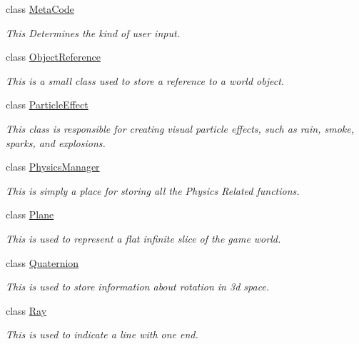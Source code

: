 \begin{DoxyCompactItemize}
class \hyperlink{classphys_1_1MetaCode}{MetaCode}
\begin{DoxyCompactList}\small\item\em This Determines the kind of user input. \item\end{DoxyCompactList}\item 
class \hyperlink{classphys_1_1ObjectReference}{ObjectReference}
\begin{DoxyCompactList}\small\item\em This is a small class used to store a reference to a world object. \item\end{DoxyCompactList}\item 
class \hyperlink{classphys_1_1ParticleEffect}{ParticleEffect}
\begin{DoxyCompactList}\small\item\em This class is responsible for creating visual particle effects, such as rain, smoke, sparks, and explosions. \item\end{DoxyCompactList}\item 
class \hyperlink{classphys_1_1PhysicsManager}{PhysicsManager}
\begin{DoxyCompactList}\small\item\em This is simply a place for storing all the Physics Related functions. \item\end{DoxyCompactList}\item 
class \hyperlink{classphys_1_1Plane}{Plane}
\begin{DoxyCompactList}\small\item\em This is used to represent a flat infinite slice of the game world. \item\end{DoxyCompactList}\item 
class \hyperlink{classphys_1_1Quaternion}{Quaternion}
\begin{DoxyCompactList}\small\item\em This is used to store information about rotation in 3d space. \item\end{DoxyCompactList}\item 
class \hyperlink{classphys_1_1Ray}{Ray}
\begin{DoxyCompactList}\small\item\em This is used to indicate a line with one end. \item\end{DoxyCompactList}\item 

\end{DoxyCompactItemize}
